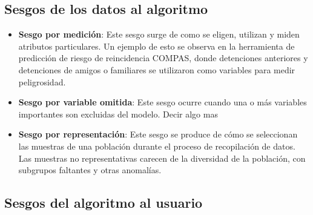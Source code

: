     \subsection{Sesgos de los datos al algoritmo}
    
    \begin{itemize}
        \item \textbf{Sesgo por medici\'on}: Este sesgo surge de como se eligen, utilizan y miden atributos particulares. Un ejemplo de esto se observa 
        en la herramienta de predicci\'on de riesgo de reincidencia COMPAS, donde detenciones anteriores y detenciones de amigos o familiares se utilizaron 
        como variables para medir peligrosidad.
        
        \item \textbf{Sesgo por variable omitida}: Este sesgo ocurre cuando una o m\'as variables importantes son excluidas del modelo. Decir algo mas
        
        \item \textbf{Sesgo por representaci\'on}: Este sesgo se produce de c\'omo se seleccionan las muestras de una poblaci\'on durante el proceso de
        recopilaci\'on de datos. Las muestras no representativas carecen de la diversidad de la poblaci\'on, con subgrupos faltantes y otras anomal\'ias.
    \end{itemize}
    
    \subsection{Sesgos del algoritmo al usuario}

